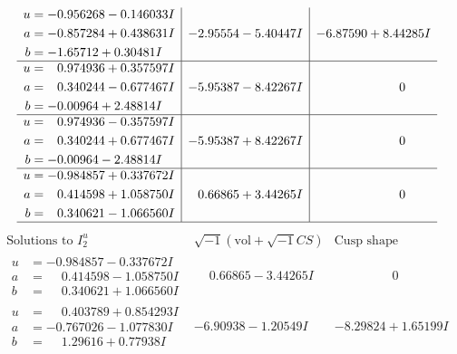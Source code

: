 \documentclass[1p]{elsarticle_modified}
\theoremstyle{definition}
\newcommand{\I}{\sqrt{-1}}
\begin{document}
$$\begin{array}{c|c|c}
\begin{aligned}
u &= -0.956268 - 0.146033 I \\
a &= -0.857284 + 0.438631 I \\
b &= -1.65712 + 0.30481 I\end{aligned}
 & -2.95554 - 5.40447 I & -6.87590 + 8.44285 I \\ \hline\begin{aligned}
u &= \phantom{-}0.974936 + 0.357597 I \\
a &= \phantom{-}0.340244 - 0.677467 I \\
b &= -0.00964 + 2.48814 I\end{aligned}
 & -5.95387 - 8.42267 I & \phantom{-0.000000 } 0 \\ \hline\begin{aligned}
u &= \phantom{-}0.974936 - 0.357597 I \\
a &= \phantom{-}0.340244 + 0.677467 I \\
b &= -0.00964 - 2.48814 I\end{aligned}
 & -5.95387 + 8.42267 I & \phantom{-0.000000 } 0 \\ \hline\begin{aligned}
u &= -0.984857 + 0.337672 I \\
a &= \phantom{-}0.414598 + 1.058750 I \\
b &= \phantom{-}0.340621 - 1.066560 I\end{aligned}
 & \phantom{-}0.66865 + 3.44265 I & \phantom{-0.000000 } 0\\
 \hline 
 \end{array}$$\newpage$$\begin{array}{c|c|c}  
\text{Solutions to }I^u_{2}& \I (\text{vol} + \sqrt{-1}CS) & \text{Cusp shape}\\
 \hline 
\begin{aligned}
u &= -0.984857 - 0.337672 I \\
a &= \phantom{-}0.414598 - 1.058750 I \\
b &= \phantom{-}0.340621 + 1.066560 I\end{aligned}
 & \phantom{-}0.66865 - 3.44265 I & \phantom{-0.000000 } 0 \\ \hline\begin{aligned}
u &= \phantom{-}0.403789 + 0.854293 I \\
a &= -0.767026 - 1.077830 I \\
b &= \phantom{-}1.29616 + 0.77938 I\end{aligned}
 & -6.90938 - 1.20549 I & -8.29824 + 1.65199 I \\ \hline\begin{aligned}

\end{aligned}
\end{array}$$
\end{document}
